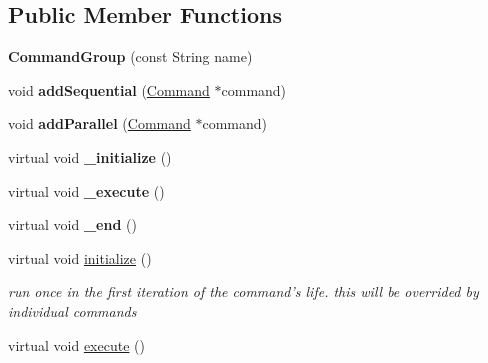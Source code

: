 \subsection*{Public Member Functions}
\begin{DoxyCompactItemize}
\item 
\hypertarget{classCommandGroup_a0167d59d8a96fbc0c1999f19610c7358}{{\bfseries Command\-Group} (const String name)}\label{classCommandGroup_a0167d59d8a96fbc0c1999f19610c7358}

\item 
\hypertarget{classCommandGroup_a6b75192504dc74794651e0d82bb83488}{void {\bfseries add\-Sequential} (\hyperlink{classCommand}{Command} $\ast$command)}\label{classCommandGroup_a6b75192504dc74794651e0d82bb83488}

\item 
\hypertarget{classCommandGroup_a8709a47f6f44a6993cd9f705b360054b}{void {\bfseries add\-Parallel} (\hyperlink{classCommand}{Command} $\ast$command)}\label{classCommandGroup_a8709a47f6f44a6993cd9f705b360054b}

\item 
\hypertarget{classCommandGroup_aad0c9576993f9f8d2431cd44f0bf0072}{virtual void {\bfseries \-\_\-initialize} ()}\label{classCommandGroup_aad0c9576993f9f8d2431cd44f0bf0072}

\item 
\hypertarget{classCommandGroup_a09355b6bb1018bdadaa0f5a1c0dec007}{virtual void {\bfseries \-\_\-execute} ()}\label{classCommandGroup_a09355b6bb1018bdadaa0f5a1c0dec007}

\item 
\hypertarget{classCommandGroup_a11f0ae6eb2ba052138d5a8930f23bb4f}{virtual void {\bfseries \-\_\-end} ()}\label{classCommandGroup_a11f0ae6eb2ba052138d5a8930f23bb4f}

\item 
\hypertarget{classCommandGroup_a99800c5dbd05ab750aa0bb27518d0467}{virtual void \hyperlink{classCommandGroup_a99800c5dbd05ab750aa0bb27518d0467}{initialize} ()}\label{classCommandGroup_a99800c5dbd05ab750aa0bb27518d0467}

\begin{DoxyCompactList}\small\item\em run once in the first iteration of the command's life. this will be overrided by individual commands \end{DoxyCompactList}\item 
\hypertarget{classCommandGroup_a5e91d370cafde43548d79945ccb4d8fe}{virtual void \hyperlink{classCommandGroup_a5e91d370cafde43548d79945ccb4d8fe}{execute} ()}\label{classCommandGroup_a5e91d370cafde43548d79945ccb4d8fe}


\end{DoxyCompactItemize}
